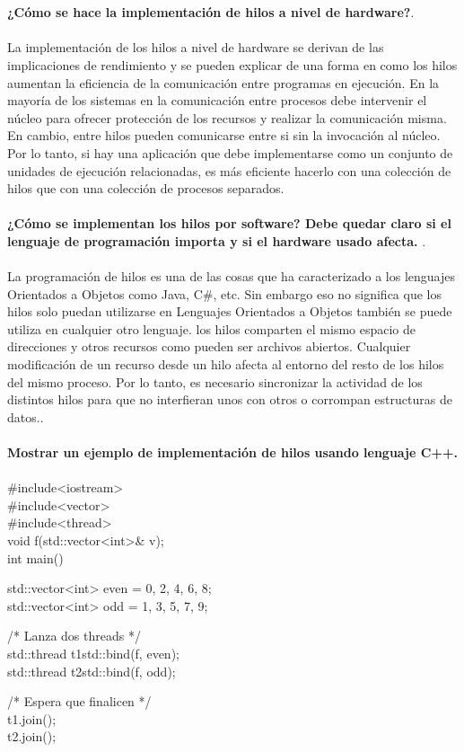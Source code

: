 \documentclass[12pt]{article}
\begin{document}
\\
\noindent
\\
\textbf{¿Cómo se hace la implementación de hilos a nivel de hardware?}.\\
\noindent
\\ 
La implementación de los hilos a nivel de hardware se derivan de las implicaciones de rendimiento y se pueden explicar de una forma en como los hilos aumentan la eficiencia de la comunicación entre programas en ejecución. En la mayoría de los sistemas en la comunicación entre procesos debe intervenir el núcleo para ofrecer protección de los recursos y realizar la comunicación misma. En cambio, entre hilos pueden comunicarse entre si sin la invocación al núcleo. Por lo tanto, si hay una aplicación que debe implementarse como un conjunto de unidades de ejecución relacionadas, es más eficiente hacerlo con una colección de hilos que con una colección de procesos separados.\\
\noindent
\\
\textbf{¿Cómo se implementan los hilos por software? Debe quedar claro si el lenguaje de programación importa y si el hardware usado afecta. }.\\
\noindent
\\
 La programación de hilos es una de las cosas que ha caracterizado a los lenguajes Orientados a Objetos como Java, C#, etc. Sin embargo eso no significa que los hilos solo puedan utilizarse en Lenguajes Orientados a Objetos también se puede utiliza en cualquier otro lenguaje. los hilos comparten el mismo espacio de direcciones y otros recursos como pueden ser archivos abiertos. Cualquier modificación de un recurso desde un hilo afecta al entorno del resto de los hilos del mismo proceso. Por lo tanto, es necesario sincronizar la actividad de los distintos hilos para que no interfieran unos con otros o corrompan estructuras de datos..\cite{sierraprogramacion2007}\\
\\
\textbf{Mostrar un ejemplo de implementación de hilos usando lenguaje C++. }\\
\\
#include<iostream>\\
#include<vector>\\
#include<thread>\\
 
void f(std::vector<int>& v);\\
 
int main()\\
{
  std::vector<int> even = {0, 2, 4, 6, 8};\\
  std::vector<int> odd = {1, 3, 5, 7, 9};
 
  /* Lanza dos threads */\\
  std::thread t1{std::bind(f, even)};\\
  std::thread t2{std::bind(f, odd)};
 
  /* Espera que finalicen */\\
  t1.join();\\
  t2.join();
}
 
\end{document}
